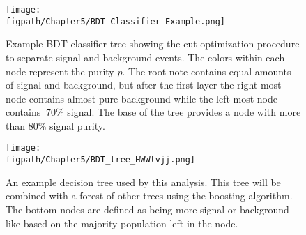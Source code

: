 \begin{figure}[!hbt]
    \centering
    \texttt{[image: \\figpath/Chapter5/BDT\_Classifier\_Example.png]}
    \caption{Example BDT classifier tree showing the cut optimization procedure to separate signal and background events. The colors within each node represent the purity $p$. The root note contains equal amounts of signal and background, but after the first layer the right-most node contains almost pure background while the left-most node contains $~$70\% signal. The base of the tree provides a node with more than 80\% signal purity.}
    \label{fig:BDT_Classifier_Example}
\end{figure}

\begin{figure}[!hbt]
    \centering
    \texttt{[image: \\figpath/Chapter5/BDT\_tree\_HWWlvjj.png]}
    \caption{An example decision tree used by this analysis. This tree will be combined with a forest of other trees using the boosting algorithm. The bottom nodes are defined as being more signal or background like based on the majority population left in the node.}
    \label{fig:BDT_tree_HWWlvjj}
\end{figure}

\begin{comment}
Boased on Rishi's thesis, but may only be applicable to gradient boosting

Training many independent decision trees without boosting will not prevent overtraining as each tree would have a different misclassification rate.
The boosting algorithm solves this by combining many decision trees (a ``forest'' of trees) to minimize the ensemble misclassification rate.
The weighted sum of the tree outputs is given by:
\begin{equation}\label{eq:decision_tree_weighted_sum}
  F\left(x\right)=\sum_{m=0}^{M}\beta_{m}f\left(x,a_{m}\right),
\end{equation}
where the $m$ trees are represented by base functions $f\left(x,a_{m}\right)$ and the set of values $\left(a_{m},\beta_{m}\right)$ are chosen to minimize a specially chosen loss function.
Note that $\beta_{m}$ improves the performance of the algorithm by reducing the learning rate.
The loss function choice determines the specific boosting procedure.
\end{comment}

